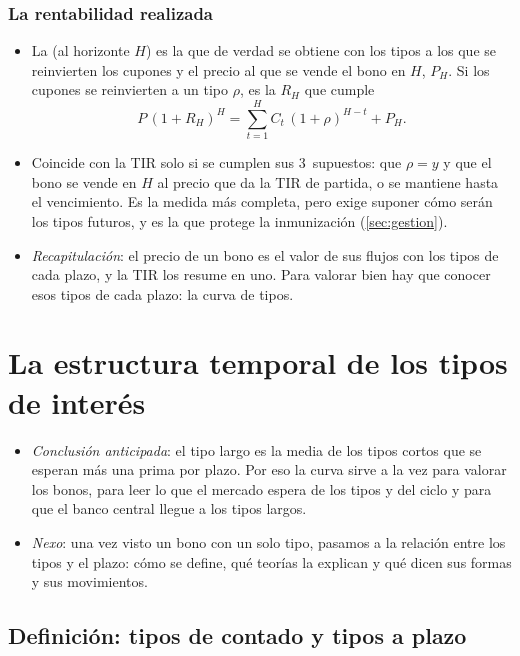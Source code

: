 \documentclass[11pt]{article}
\begin{document}
\subsubsection{La rentabilidad realizada}\label{sec:rent-realizada}

\begin{itemize}
\item La  (al horizonte $H$) es la que de verdad se obtiene con los tipos a los que se reinvierten los cupones y el precio al que se vende el bono en $H$, $P_H$. Si los cupones se reinvierten a un tipo $\rho$, es la $R_H$ que cumple
  \[
  P\,(1+R_H)^H=\sum_{t=1}^{H}C_t\,(1+\rho)^{H-t}+P_H .
  \]
\item Coincide con la TIR solo si se cumplen sus 3~supuestos: que $\rho=y$ y que el bono se vende en $H$ al precio que da la TIR de partida, o se mantiene hasta el vencimiento. Es la medida más completa, pero exige suponer cómo serán los tipos futuros, y es la que protege la inmunización (\ref{sec:gestion}).
\item \emph{Recapitulación}: el precio de un bono es el valor de sus flujos con los tipos de cada plazo, y la TIR los resume en uno. Para valorar bien hay que conocer esos tipos de cada plazo: la curva de tipos.
\end{itemize}

\section{La estructura temporal de los tipos de interés}\label{sec:etti}

\begin{itemize}
\item \emph{Conclusión anticipada}: el tipo largo es la media de los tipos cortos que se esperan más una prima por plazo. Por eso la curva sirve a la vez para valorar los bonos, para leer lo que el mercado espera de los tipos y del ciclo y para que el banco central llegue a los tipos largos.
\item \emph{Nexo}: una vez visto un bono con un solo tipo, pasamos a la relación entre los tipos y el plazo: cómo se define, qué teorías la explican y qué dicen sus formas y sus movimientos.
\end{itemize}

\subsection{Definición: tipos de contado y tipos a plazo}\label{sec:etti-definicion}
\end{document}
